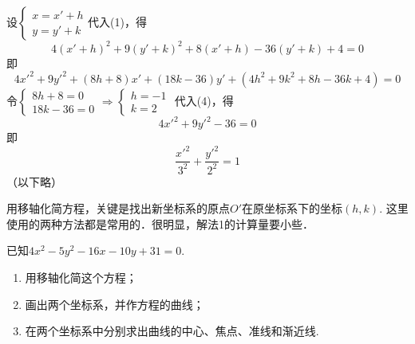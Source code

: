 \begin{solution}
设$\begin{cases}
    x=x'+h\\ y=y'+k
\end{cases}$代入(1)，得
\[4(x'+h)^2+9(y'+k)^2+8(x'+h)-36(y'+k)+4=0\]
即
\begin{equation}
    4{x'}^2+9{y'}^2+(8h+8)x'+(18k-36)y'+(4h^2+9k^2+8h-36k+4)=0 \tag{4}
\end{equation}
令$\begin{cases}
    8h+8=0 \\ 18k-36=0
\end{cases}\Rightarrow \begin{cases}
    h=-1\\ k=2
\end{cases}$
代入(4)，得
\[4{x'}^2+9{y'}^2-36=0\]
即
\[\frac{{x'}^2}{3^2}+\frac{{y'}^2}{2^2}=1\]
（以下略）
\end{solution}

\begin{remark}
    用移轴化简方程，关键是找出新坐标系的原点$O'$在原坐标系下的坐标$(h,k)$. 这里使用的两种方法都是常用的．很明显，解法1的计算量要小些．
\end{remark}

\begin{example}
已知$4x^2-5y^2-16x-10y+31=0$.
\begin{enumerate}[(1)]
\item 用移轴化简这个方程；
\item 画出两个坐标系，并作方程的曲线；
\item 在两个坐标系中分别求出曲线的中心、焦点、准线和渐近线.  
\end{enumerate}
\end{example}

